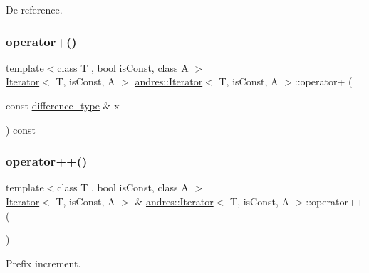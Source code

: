 De-\/reference. \mbox{\label{classandres_1_1Iterator_a3777cbd5f8b239d4fae5ba457b6820dc}} 
\subsubsection{\texorpdfstring{operator+()}{operator+()}}
{\footnotesize\ttfamily template$<$class T , bool is\+Const, class A $>$ \\
\hyperlink{classandres_1_1Iterator}{Iterator}$<$ T, is\+Const, A $>$ \hyperlink{classandres_1_1Iterator}{andres\+::\+Iterator}$<$ T, is\+Const, A $>$\+::operator+ (\begin{DoxyParamCaption}\item[{const \hyperlink{classandres_1_1Iterator_a10f8053d87b6b597d9fe011f66a240ca}{difference\+\_\+type} \&}]{x }\end{DoxyParamCaption}) const\hspace{0.3cm}{\ttfamily [inline]}}

\mbox{\label{classandres_1_1Iterator_aa25f91324c261608591f0d072afa8ac2}} 
\subsubsection{\texorpdfstring{operator++()}{operator++()}\hspace{0.1cm}{\footnotesize\ttfamily [1/2]}}
{\footnotesize\ttfamily template$<$class T , bool is\+Const, class A $>$ \\
\hyperlink{classandres_1_1Iterator}{Iterator}$<$ T, is\+Const, A $>$ \& \hyperlink{classandres_1_1Iterator}{andres\+::\+Iterator}$<$ T, is\+Const, A $>$\+::operator++ (\begin{DoxyParamCaption}{ }\end{DoxyParamCaption})\hspace{0.3cm}{\ttfamily [inline]}}

Prefix increment. \mbox{\label{classandres_1_1Iterator_a3f16288a75cc46f0f597da32d4af4cc8}} 
